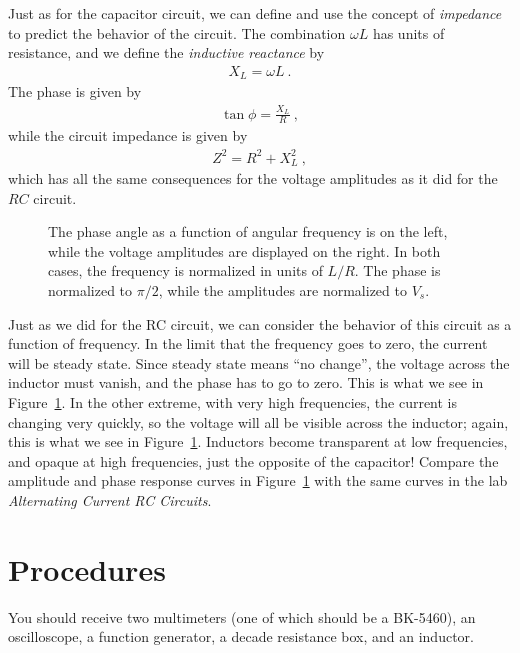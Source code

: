 \documentclass[12pt]{article}
\begin{document}
Just as for the capacitor circuit, we can define and use the concept
of \textit{impedance} to predict the behavior of the circuit.  The
combination $\omega L$ has units of resistance, and we
define the \textit{inductive reactance} by
\begin{gather*}
  X_L = \omega L\ .
\end{gather*}
The phase is given by
\begin{gather*}
  \tan\phi = \frac{X_L}{R}\ ,
\end{gather*}
while the circuit impedance is given by
\begin{gather*}
  Z^2 = R^2 + X_L^2\ ,
\end{gather*}
which has all the same consequences for the voltage amplitudes as it
did for the $RC$ circuit.

\begin{figure}
  \centering
  \caption{The phase angle as a function of angular frequency is on
    the left, while the voltage amplitudes are displayed on the
    right.  In both cases, the frequency is normalized in units of
    $L/R$.  The phase is normalized to $\pi/2$, while the amplitudes
    are normalized to $V_s$.}
  \label{fig:frequency}
\end{figure}
Just as we did for the RC circuit, we can consider the behavior of
this circuit as a function of frequency.  In the limit that the
frequency goes to zero, the current will be steady state.  Since
steady state means ``no change'', the voltage across the inductor must
vanish, and the phase has to go to zero.  This is what we see in
Figure~\ref{fig:frequency}.  In the other extreme, with very high
frequencies, the current is changing very quickly, so the voltage will
all be visible across the inductor; again, this is what we see in
Figure~\ref{fig:frequency}.  Inductors become transparent at low
frequencies, and opaque at high frequencies, just the opposite of the
capacitor!  Compare the amplitude and phase response curves in
Figure~\ref{fig:frequency} with the same curves in the lab
\textit{Alternating Current RC Circuits}.

\section{Procedures}
\label{sec:procedures}

You should receive two multimeters (one of which should be a
BK-5460), an oscilloscope, a function generator, a
decade resistance box, and an inductor.
\end{document}
